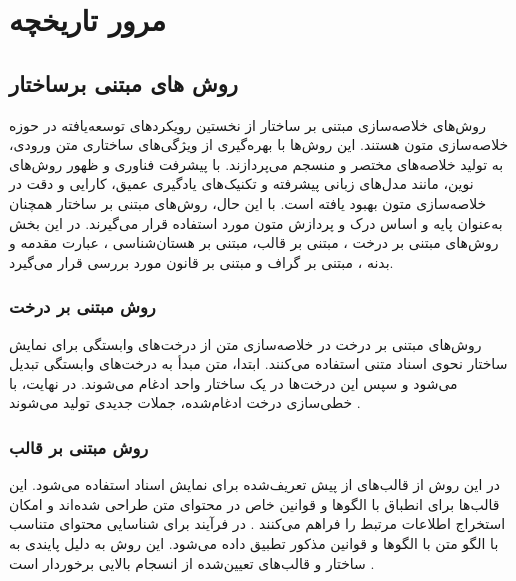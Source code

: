 \chapter{مرور تاریخچه}

\section{روش های مبتنی برساختار}
روش‌های خلاصه‌سازی مبتنی بر ساختار از نخستین رویکردهای توسعه‌یافته در حوزه خلاصه‌سازی متون هستند. این روش‌ها با بهره‌گیری از ویژگی‌های ساختاری متن ورودی، به تولید خلاصه‌های مختصر و منسجم می‌پردازند.
 با پیشرفت فناوری و ظهور روش‌های نوین، مانند مدل‌های زبانی پیشرفته و تکنیک‌های یادگیری عمیق، کارایی و دقت در خلاصه‌سازی متون بهبود یافته است. با این حال، روش‌های مبتنی بر ساختار همچنان به‌عنوان پایه و اساس درک و پردازش متون مورد استفاده قرار می‌گیرند. در این بخش روش‌های مبتنی بر درخت 
، مبتنی بر قالب،
مبتنی بر هستان‌شناسی
، عبارت مقدمه و بدنه
، مبتنی بر گراف
و مبتنی بر قانون
مورد بررسی قرار می‌گیرد. 

\subsection{روش مبتنی بر درخت}
روش‌های مبتنی بر درخت در خلاصه‌سازی متن از درخت‌های وابستگی برای نمایش ساختار نحوی اسناد متنی استفاده می‌کنند. ابتدا، متن مبدأ به درخت‌های وابستگی تبدیل می‌شود و سپس این درخت‌ها در یک ساختار واحد ادغام می‌شوند. در نهایت، با خطی‌سازی درخت ادغام‌شده، جملات جدیدی تولید می‌شوند 
\cite{andhale2016overview}.
\subsection{روش مبتنی بر قالب}
در این روش‌ از قالب‌های از پیش تعریف‌شده برای نمایش اسناد استفاده می‌شود. این قالب‌ها برای انطباق با الگوها و قوانین خاص در محتوای متن طراحی شده‌اند و امکان استخراج اطلاعات مرتبط را فراهم می‌کنند 
. در فرآیند برای شناسایی محتوای متناسب با الگو متن با الگوها و قوانین مذکور تطبیق داده می‌شود. این روش به دلیل پایندی به ساختار و قالب‌های تعیین‌شده از انسجام بالایی برخوردار است \cite{andhale2016overview}.
